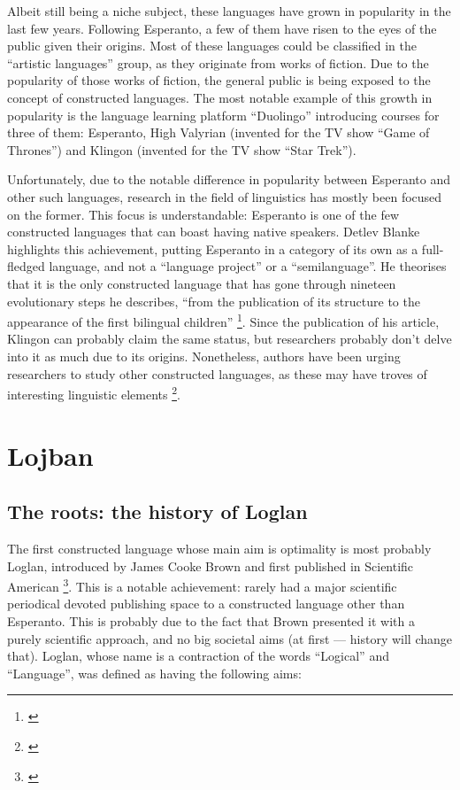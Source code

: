 \vspace{-0.05cm}
Albeit still being a niche subject, these languages have grown in popularity in the last few years. Following Esperanto, a few of them have risen to the eyes of the public
given their origins. Most of these languages could be classified in the ``artistic languages'' group, as they originate from works of fiction. Due to the popularity of those works of
fiction, the general public is being exposed to the concept of constructed languages. The most notable example of this growth in popularity is the language learning platform
``Duolingo'' introducing courses for three of them: Esperanto, High Valyrian (invented for the TV show ``Game of Thrones'') and Klingon (invented for the TV show ``Star Trek''). \newline

\vspace{-0.05cm}
Unfortunately, due to the notable difference in popularity between Esperanto and other such languages, research in the field of linguistics has mostly been focused on the former.
This focus is understandable: Esperanto is one of the few constructed languages that can boast having native speakers. Detlev Blanke highlights this achievement, putting Esperanto
in a category of its own as a full-fledged language, and not a ``language project'' or a ``semilanguage''. He theorises that it is the only constructed language that has gone through nineteen
evolutionary steps he describes, ``from the publication of its structure to the appearance of the first bilingual children'' \footnote{\cite{blanke1989planned}}.
Since the publication of his article, Klingon can probably claim the same status, but researchers probably don't delve into it as much due to its origins.
Nonetheless, authors have been urging researchers to study other constructed languages, as these may have troves of interesting linguistic elements \footnote{\cite{oostendorp2001constructed}}.

\section{Lojban}

\subsection{The roots: the history of Loglan}

The first constructed language whose main aim is optimality is most probably Loglan, introduced by James Cooke Brown and first published
in Scientific American \footnote{\cite{brown1960loglan}}. This is a notable achievement: rarely had a major scientific periodical devoted publishing
space to a constructed language other than Esperanto. This is probably due to the fact that Brown presented it with a purely scientific approach, and no big societal aims
(at first --- history will change that). Loglan, whose name is a contraction of the words ``Logical'' and ``Language'', was defined as having the following aims:

